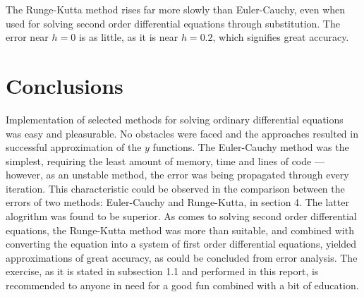 \documentclass[a4paper,12pt]{article}
\begin{document}
The Runge-Kutta method rises far more slowly than Euler-Cauchy, even when used for solving second order differential equations through substitution. The error near $h = 0$ is as little, as it is near $h = 0.2$, which signifies great accuracy. 

\section{Conclusions}
Implementation of selected methods for solving ordinary differential equations was easy and pleasurable. No obstacles were faced and the approaches resulted in successful approximation of the $y$ functions. The Euler-Cauchy method was the simplest, requiring the least amount of memory, time and lines of code --- however, as an unstable method, the error was being propagated through every iteration. This characteristic could be observed in the comparison between the errors of two methods: Euler-Cauchy and Runge-Kutta, in section 4. The latter alogrithm was found to be superior. As comes to solving second order differential equations, the Runge-Kutta method was more than suitable, and combined with converting the equation into a system of first order differential equations, yielded approximations of great accuracy, as could be concluded from error analysis. The exercise, as it is stated in subsection 1.1 and performed in this report, is recommended to anyone in need for a good fun combined with a bit of education.
\end{document}
